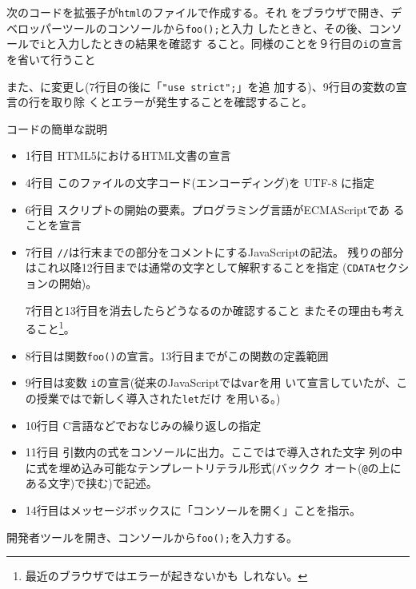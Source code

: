 \begin{Prob}\label{FisatJS}\upshape
 次のコードを拡張子が\Verb+html+のファイルで作成する。それ
 をブラウザで開き、デベロッパーツールのコンソールから\Verb+foo();+と入力
 したときと、その後、コンソールで\texttt{i}と入力したときの結果を確認す
 ること。{同様のことを９行目の\Verb+i+の宣言を省いて行うこと}

 また、\Strict に変更し(7行目の後に「\Verb+"use strict";+」を追
 加する)、9行目の変数の宣言の行を取り除
 くとエラーが発生することを確認すること。
\end{Prob}
コードの簡単な説明
\begin{itemize}
 \item 1行目 HTML5におけるHTML文書の宣言
 \item 4行目 このファイルの文字コード(エンコーディング)を UTF-8 に指定
 \item 6行目 スクリプトの開始の要素。プログラミング言語がECMAScriptであ
       ることを宣言
 \item 7行目 \texttt{//}は行末までの部分をコメントにするJavaScriptの記法。
残りの部分はこれ以降12行目までは通常の文字として解釈することを指定
       (\texttt{CDATA}セクションの開始)。

      7行目と13行目を消去したらどうなるのか確認すること
またその理由も考えること\footnote{最近のブラウザではエラーが起きないかも
       しれない。}。
 \item 8行目は関数\Verb+foo()+の宣言。13行目までがこの関数の定義範囲
 \item 9行目は変数 \texttt{i}の宣言(従来のJavaScriptでは\texttt{var}を用
       いて宣言していたが、この授業では\ES で新しく導入された\texttt{let}だけ
       を用いる。)
 \item 10行目 C言語などでおなじみの繰り返しの指定
 \item 11行目 引数内の式をコンソールに出力。ここでは\ES で導入された文字
       列の中に式を埋め込み可能なテンプレートリテラル形式(バックク
       オート(\Verb+@+の上にある文字)で挟む)で記述。
 \item 14行目はメッセージボックスに「コンソールを開く」ことを指示。
\end{itemize}
開発者ツールを開き、コンソールから\Verb+foo();+を入力する。
